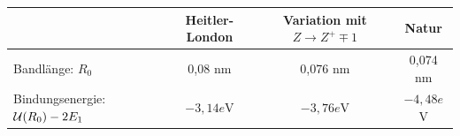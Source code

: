 \FloatBarrier
	\begin{tabular}{l | c | c | c}
		 & Heitler-London & Variation mit $Z \rightarrow Z^+ \mp 1$ & Natur \\
		 \hline 
		Bandlänge: $R_0$ & 0,08 nm & 0,076 nm & 0,074 nm \\
		Bindungsenergie: $\mathcal{U} (R_0) - 2E_1$ & $-3,14 e$V & $-3,76 e$V & $-4,48 e$V \\ 
	\end{tabular}
